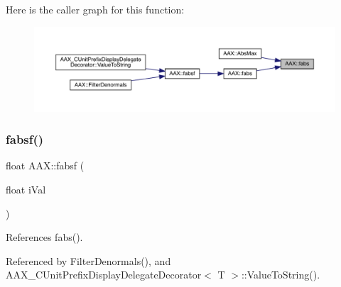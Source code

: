 Here is the caller graph for this function\+:
\nopagebreak
\begin{figure}[H]
\begin{center}
\leavevmode
\includegraphics[width=350pt]{a00852_af486dfb226661e4a47d7b42eca881759_icgraph}
\end{center}
\end{figure}
\mbox{\label{a00852_a7fc4d4cd59850b8b875d085467ff5850}} 
\subsubsection{\texorpdfstring{fabsf()}{fabsf()}}
{\footnotesize\ttfamily float A\+A\+X\+::fabsf (\begin{DoxyParamCaption}\item[{float}]{i\+Val }\end{DoxyParamCaption})\hspace{0.3cm}{\ttfamily [inline]}}



References fabs().



Referenced by Filter\+Denormals(), and A\+A\+X\+\_\+\+C\+Unit\+Prefix\+Display\+Delegate\+Decorator$<$ T $>$\+::\+Value\+To\+String().

